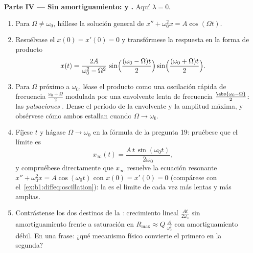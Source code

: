 \begin{problem}
\medskip
\noindent\textbf{Parte IV --- Sin amortiguamiento:  y
.} Aquí $\lambda = 0$.
\begin{enumerate}[resume]
  \item Para $\Omega \neq \omega_0$, hállese la solución general de
        $x'' + \omega_0^2 x = A\cos(\Omega t)$.
  \item Resuélvase el  $x(0) = x'(0) = 0$ y
        transfórmese la respuesta en la forma de producto
        \[
        x(t) = \frac{2A}{\omega_0^2 - \Omega^2}\,
        \sin\Bigl(\frac{(\omega_0 - \Omega)t}2\Bigr)
        \sin\Bigl(\frac{(\omega_0 + \Omega)t}2\Bigr) .
        \]
  \item Para $\Omega$ próximo a $\omega_0$, léase el producto como una
        oscilación rápida de frecuencia $\frac{\omega_0 + \Omega}2$
        modulada por una envolvente lenta de frecuencia
        $\frac{\abs{\omega_0 - \Omega}}2$: las \emph{pulsaciones}
        . Dense el período de la envolvente y la
        amplitud máxima, y obsérvese cómo ambos estallan cuando
        $\Omega \to \omega_0$.
  \item Fíjese $t$ y hágase $\Omega \to \omega_0$ en la fórmula de la
        pregunta 19: pruébese que el límite es
        \[
        x_\infty(t) = \frac{A\,t\,\sin(\omega_0 t)}{2\omega_0} ,
        \]
        y compruébese directamente que $x_\infty$ resuelve la ecuación
        resonante $x'' + \omega_0^2 x = A\cos(\omega_0 t)$ con
        $x(0) = x'(0) = 0$ (compárese con
        el~\cref{ex:b1:diffeq:oscillation}): la  es el límite
        de  cada vez más lentas y más amplias.
  \item Contrástense los dos destinos de la : crecimiento
        lineal $\frac{At}{2\omega_0}$ sin amortiguamiento frente a
        saturación en $R_{\max} \approx Q\,\frac{A}{\omega_0^2}$ con
        amortiguamiento débil. En una frase: ¿qué mecanismo físico
        convierte el primero en la segunda?
\end{enumerate}


\end{problem}
